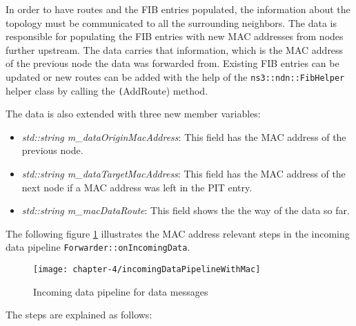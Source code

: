 In order to have routes and the FIB entries populated, the information about the topology must be communicated to all the surrounding neighbors. The data is responsible for populating the FIB entries with new MAC addresses from nodes further upstream. The data carries that information, which is the MAC address of the previous node the data was forwarded from. Existing FIB entries can be updated or new routes can be added with the help of the \texttt{ns3::ndn::FibHelper} helper class by calling the \texttt(AddRoute) method.

The data is also extended with three new member variables:

\begin{itemize}
\item \emph{std::string m\_dataOriginMacAddress}: This field has the MAC address of the previous node.
\item \emph{std::string m\_dataTargetMacAddress}: This field has the MAC address of the next node if a MAC address was left in the PIT entry.
\item \emph{std::string m\_macDataRoute}: This field shows the the way of the data so far.
\end{itemize}

The following figure \ref{fig:incomingDataPipelineWithMac} illustrates the MAC address relevant steps in the incoming data pipeline \texttt{Forwarder::onIncomingData}.

\vspace{5mm} %

\begin{figure}[H]
  \centering
  \texttt{[image: chapter-4/incomingDataPipelineWithMac]}
  \caption{Incoming data pipeline for data messages}
  \label{fig:incomingDataPipelineWithMac}
\end{figure}

\vspace{5mm} %

The steps are explained as follows:

